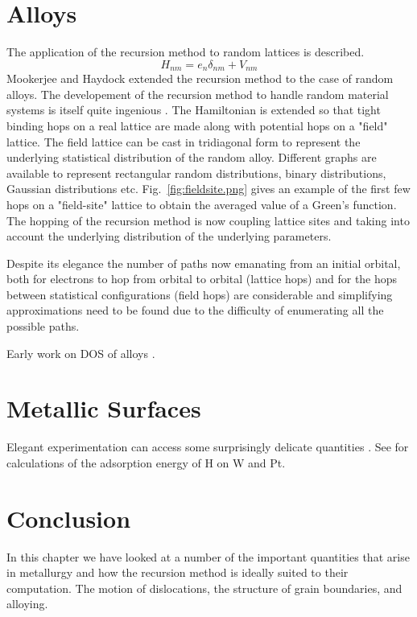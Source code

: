 
\section{Alloys}
The application of the recursion method to random lattices is described.
\cite{glaser81}
%
\begin{equation}
H_{nm} = e_{n}\delta_{nm} + V_{nm}
\end{equation}
%
Mookerjee and Haydock extended the recursion method to the case of random alloys.
The developement of the recursion method to handle random material systems is 
itself quite ingenious \cite{mookerjee, haydock74}. The Hamiltonian is extended
so that tight binding hops on a real lattice are made along with potential hops
on a "field" lattice. The field lattice can be cast in tridiagonal form to represent
the underlying statistical distribution of the random alloy. Different graphs are available
to represent rectangular random distributions, binary distributions, Gaussian distributions
etc. Fig.~\ref{fig:fieldsite.png} gives an example of the first few hops on a "field-site" 
lattice to obtain the averaged value of a Green's function. The hopping of the recursion method
is now coupling lattice sites and taking into account the underlying distribution of 
the underlying parameters.

Despite its elegance the number of paths now emanating from an initial orbital, both
for electrons to hop from orbital to orbital (lattice hops) and for the hops between 
statistical configurations (field hops) are considerable and simplifying approximations 
need to be found due to the difficulty of enumerating all the possible paths.

Early work on DOS of alloys \cite{cubiotti77}. 

\section{Metallic Surfaces}
Elegant experimentation can access some surprisingly delicate quantities \cite{whipp34}.
See \cite{bullet77} for calculations of the adsorption energy of H on W and Pt.

\section{Conclusion}
In this chapter we have looked at a number of the important quantities that
arise in metallurgy and how the recursion method is ideally suited to their 
computation. The motion of dislocations, the structure of grain boundaries, 
and alloying. 

